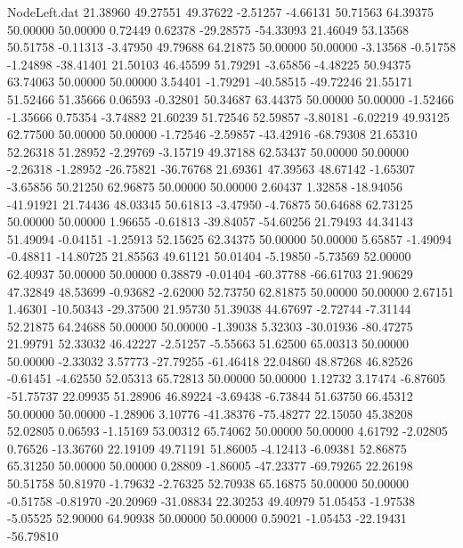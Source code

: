 \begin{filecontents}{NodeLeft.dat}
  21.38960   49.27551   49.37622    -2.51257   -4.66131   50.71563   64.39375   50.00000   50.00000    0.72449    0.62378  -29.28575  -54.33093
  21.46049   53.13568   50.51758    -0.11313   -3.47950   49.79688   64.21875   50.00000   50.00000   -3.13568   -0.51758   -1.24898  -38.41401
  21.50103   46.45599   51.79291    -3.65856   -4.48225   50.94375   63.74063   50.00000   50.00000    3.54401   -1.79291  -40.58515  -49.72246
  21.55171   51.52466   51.35666     0.06593   -0.32801   50.34687   63.44375   50.00000   50.00000   -1.52466   -1.35666    0.75354   -3.74882
  21.60239   51.72546   52.59857    -3.80181   -6.02219   49.93125   62.77500   50.00000   50.00000   -1.72546   -2.59857  -43.42916  -68.79308
  21.65310   52.26318   51.28952    -2.29769   -3.15719   49.37188   62.53437   50.00000   50.00000   -2.26318   -1.28952  -26.75821  -36.76768
  21.69361   47.39563   48.67142    -1.65307   -3.65856   50.21250   62.96875   50.00000   50.00000    2.60437    1.32858  -18.94056  -41.91921
  21.74436   48.03345   50.61813    -3.47950   -4.76875   50.64688   62.73125   50.00000   50.00000    1.96655   -0.61813  -39.84057  -54.60256
  21.79493   44.34143   51.49094    -0.04151   -1.25913   52.15625   62.34375   50.00000   50.00000    5.65857   -1.49094   -0.48811  -14.80725
  21.85563   49.61121   50.01404    -5.19850   -5.73569   52.00000   62.40937   50.00000   50.00000    0.38879   -0.01404  -60.37788  -66.61703
  21.90629   47.32849   48.53699    -0.93682   -2.62000   52.73750   62.81875   50.00000   50.00000    2.67151    1.46301  -10.50343  -29.37500
  21.95730   51.39038   44.67697    -2.72744   -7.31144   52.21875   64.24688   50.00000   50.00000   -1.39038    5.32303  -30.01936  -80.47275
  21.99791   52.33032   46.42227    -2.51257   -5.55663   51.62500   65.00313   50.00000   50.00000   -2.33032    3.57773  -27.79255  -61.46418
  22.04860   48.87268   46.82526    -0.61451   -4.62550   52.05313   65.72813   50.00000   50.00000    1.12732    3.17474   -6.87605  -51.75737
  22.09935   51.28906   46.89224    -3.69438   -6.73844   51.63750   66.45312   50.00000   50.00000   -1.28906    3.10776  -41.38376  -75.48277
  22.15050   45.38208   52.02805     0.06593   -1.15169   53.00312   65.74062   50.00000   50.00000    4.61792   -2.02805    0.76526  -13.36760
  22.19109   49.71191   51.86005    -4.12413   -6.09381   52.86875   65.31250   50.00000   50.00000    0.28809   -1.86005  -47.23377  -69.79265
  22.26198   50.51758   50.81970    -1.79632   -2.76325   52.70938   65.16875   50.00000   50.00000   -0.51758   -0.81970  -20.20969  -31.08834
  22.30253   49.40979   51.05453    -1.97538   -5.05525   52.90000   64.90938   50.00000   50.00000    0.59021   -1.05453  -22.19431  -56.79810

\end{filecontents}
